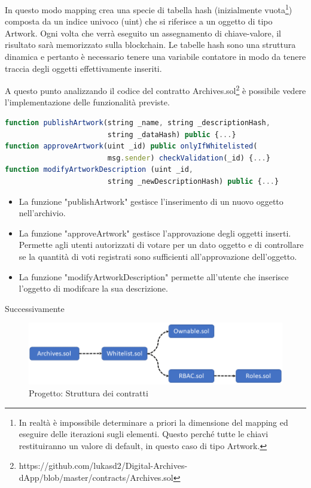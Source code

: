 In questo modo mapping crea una specie di tabella hash (inizialmente vuota\footnote{In realtà è impossibile determinare a priori la dimensione del mapping ed eseguire delle iterazioni sugli elementi. Questo perché tutte le chiavi restituiranno un valore di default, in questo caso di tipo Artwork.}) composta da un indice univoco (uint) che si riferisce a un oggetto di tipo Artwork. Ogni volta che verrà eseguito un assegnamento di chiave-valore, il risultato sarà memorizzato sulla blockchain. Le tabelle hash sono una struttura dinamica e pertanto è necessario tenere una variabile contatore in modo da tenere traccia degli oggetti effettivamente inseriti.

A questo punto analizzando il codice del contratto Archives.sol\footnote{https://github.com/lukasd2/Digital-Archives-dApp/blob/master/contracts/Archives.sol} è possibile vedere l'implementazione delle funzionalità previste.
\\
\begin{lstlisting}[caption={Funzioni del contratto Archives.sol},language=JavaScript]
function publishArtwork(string _name, string _descriptionHash, 
                        string _dataHash) public {...}
function approveArtwork(uint _id) public onlyIfWhitelisted(
                        msg.sender) checkValidation(_id) {...}
function modifyArtworkDescription (uint _id, 
                        string _newDescriptionHash) public {...}
\end{lstlisting}

\begin{itemize}
\item La funzione "publishArtwork" gestisce l'inserimento di un nuovo oggetto nell'archivio.
\item La funzione "approveArtwork" gestisce l'approvazione degli oggetti inserti. Permette agli utenti autorizzati di votare per un dato oggetto e di controllare se la quantità di voti registrati sono sufficienti all'approvazione dell'oggetto.
\item La funzione "modifyArtworkDescription" permette all'utente che inserisce l'oggetto di modifcare la sua descrizione.
\end{itemize}

Successivamente 

\begin{figure}[H]
\centering
\includegraphics[width=1\textwidth]{immagini/contractStructure.png}
\caption{Progetto: Struttura dei contratti}
\label{fig:contractStructure}
\end{figure}

